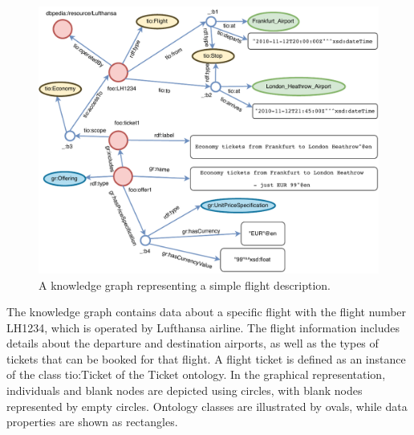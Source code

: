 \documentclass[runningheads]{llncs}
\begin{document}
\begin{figure}[H]
  \centering
  \includegraphics[width=\linewidth]{img/use_case}
  \caption{A knowledge graph representing a simple flight description.}
  \label{fig:usecase}
\end{figure}


The knowledge graph contains data about a specific flight with the flight number LH1234, which is operated by Lufthansa airline. The flight information includes details about the departure and destination airports, as well as the types of tickets that can be booked for that flight. A flight ticket is defined as an instance of the class tio:Ticket of the Ticket ontology. In the graphical representation, individuals and blank nodes are depicted using circles, with blank nodes represented by empty circles. Ontology classes are illustrated by ovals, while data properties are shown as rectangles. 
\end{document}
